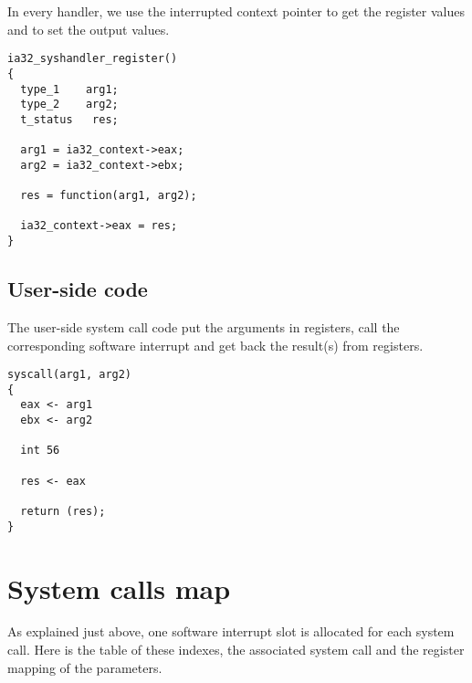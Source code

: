 In every handler, we use the interrupted context pointer to get the
register values and to set the output values.

\begin{verbatim}
ia32_syshandler_register()
{
  type_1    arg1;
  type_2    arg2;
  t_status   res;

  arg1 = ia32_context->eax;
  arg2 = ia32_context->ebx;

  res = function(arg1, arg2);

  ia32_context->eax = res;
}
\end{verbatim}

%
%

\subsection{User-side code}

The user-side system call code put the arguments in registers, call
the corresponding software interrupt and get back the result(s) from
registers.

\begin{verbatim}
syscall(arg1, arg2)
{
  eax <- arg1
  ebx <- arg2

  int 56

  res <- eax

  return (res);
}
\end{verbatim}

%
%

\section{System calls map}

As explained just above, one software interrupt slot is allocated for
each system call. Here is the table of these indexes, the associated
system call and the register mapping of the parameters.

